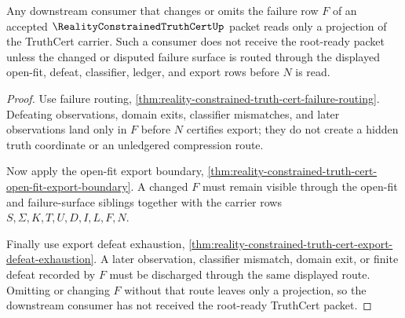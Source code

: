 \begin{theorem}
\label{thm:reality-constrained-truth-cert-root-defeat-projection}
Any downstream consumer that changes or omits the failure row $F$ of an
accepted $\RealityConstrainedTruthCertUp$ packet reads only a projection of the
TruthCert carrier. Such a consumer does not receive the root-ready packet
unless the changed or disputed failure surface is routed through the displayed
open-fit, defeat, classifier, ledger, and export rows before $N$ is read.
\end{theorem}
\begin{proof}
Use failure routing,
\autoref{thm:reality-constrained-truth-cert-failure-routing}. Defeating
observations, domain exits, classifier mismatches, and later observations land
only in $F$ before $N$ certifies export; they do not create a hidden truth
coordinate or an unledgered compression route.

Now apply the open-fit export boundary,
\autoref{thm:reality-constrained-truth-cert-open-fit-export-boundary}. A
changed $F$ must remain visible through the open-fit and failure-surface
siblings together with the carrier rows $S,\Sigma,K,T,U,D,I,L,F,N$.

Finally use export defeat exhaustion,
\autoref{thm:reality-constrained-truth-cert-export-defeat-exhaustion}. A later
observation, classifier mismatch, domain exit, or finite defeat recorded by
$F$ must be discharged through the same displayed route. Omitting or changing
$F$ without that route leaves only a projection, so the downstream consumer has
not received the root-ready TruthCert packet.
\end{proof}

